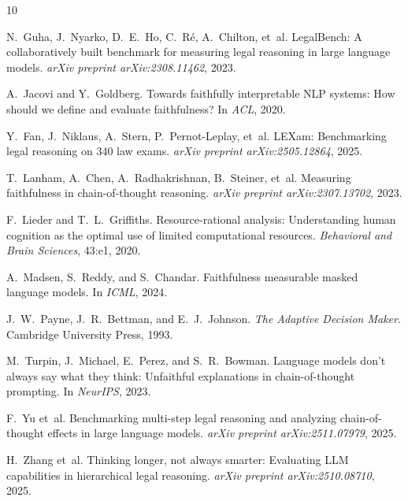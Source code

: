 \documentclass[11pt]{article}
\begin{document}

\begin{thebibliography}{10}

N.~Guha, J.~Nyarko, D.~E.~Ho, C.~R\'{e}, A.~Chilton, et~al.
\newblock LegalBench: A collaboratively built benchmark for measuring legal reasoning in large language models.
\newblock \emph{arXiv preprint arXiv:2308.11462}, 2023.

A.~Jacovi and Y.~Goldberg.
\newblock Towards faithfully interpretable NLP systems: How should we define and evaluate faithfulness?
\newblock In \emph{ACL}, 2020.

Y.~Fan, J.~Niklaus, A.~Stern, P.~Pernot-Leplay, et~al.
\newblock LEXam: Benchmarking legal reasoning on 340 law exams.
\newblock \emph{arXiv preprint arXiv:2505.12864}, 2025.

T.~Lanham, A.~Chen, A.~Radhakrishnan, B.~Steiner, et~al.
\newblock Measuring faithfulness in chain-of-thought reasoning.
\newblock \emph{arXiv preprint arXiv:2307.13702}, 2023.

F.~Lieder and T.~L.~Griffiths.
\newblock Resource-rational analysis: Understanding human cognition as the optimal use of limited computational resources.
\newblock \emph{Behavioral and Brain Sciences}, 43:e1, 2020.

A.~Madsen, S.~Reddy, and S.~Chandar.
\newblock Faithfulness measurable masked language models.
\newblock In \emph{ICML}, 2024.

J.~W.~Payne, J.~R.~Bettman, and E.~J.~Johnson.
\newblock \emph{The Adaptive Decision Maker}.
\newblock Cambridge University Press, 1993.

M.~Turpin, J.~Michael, E.~Perez, and S.~R.~Bowman.
\newblock Language models don't always say what they think: Unfaithful explanations in chain-of-thought prompting.
\newblock In \emph{NeurIPS}, 2023.

F.~Yu et~al.
\newblock Benchmarking multi-step legal reasoning and analyzing chain-of-thought effects in large language models.
\newblock \emph{arXiv preprint arXiv:2511.07979}, 2025.

H.~Zhang et~al.
\newblock Thinking longer, not always smarter: Evaluating LLM capabilities in hierarchical legal reasoning.
\newblock \emph{arXiv preprint arXiv:2510.08710}, 2025.

\end{thebibliography}
\end{document}
